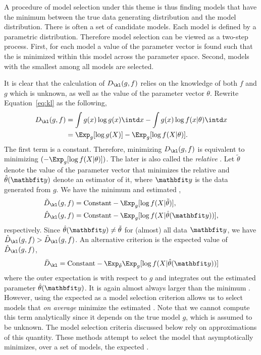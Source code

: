 A procedure of model selection under this theme is thus finding models that have the minimum \kld between the true data generating distribution and the model distribution. There is often a set of candidate models. Each model is defined by a parametric distribution. Therefore model selection can be viewed as a two-step process. First, for each model a value of the parameter vector is found such that the \kld is minimized within this model across the parameter space. Second, models with the smallest \kld among all models are selected.

It is clear that the calculation of $D_{\kl}(g,f)$ relies on the knowledge of both $f$ and $g$ which is unknown, as well as the value of the parameter vector $\theta$. Rewrite Equation~\eqref{eq:kl} as the following,
\begin{align}
  D_{\kl}(g,f)
  &= \int g(x)\log g(x) \intd x - \int g(x) \log f(x|\theta) \intd x \notag\\
  &= \Exp_g[\log g(X)] - \Exp_g[\log f(X|\theta)].
\end{align}
The first term is a constant. Therefore, minimizing $D_{\kl}(g,f)$ is equivalent to minimizing $(-\Exp_g[\log f(X|\theta)])$. The later is also called the \emph{relative} \kldfull. Let $\tilde\theta$ denote the value of the parameter vector that minimizes the relative \kld and $\hat\theta(\data)$ denote an estimator of it, where $\data$ is the data generated from $g$. We have the minimum and estimated \kld,
\begin{align}
  \tilde{D}_{\kl}(g,f) &= \text{Constant} - \Exp_g[\log f(X|\tilde\theta)], \\
  \hat{D}_{\kl}(g,f) &= \text{Constant} - \Exp_g[\log f(X|\hat\theta(\data))],
\end{align}
respectively. Since $\hat\theta(\data)\ne\tilde\theta$ for (almost) all data $\data$, we have $\hat{D}_{\kl}(g,f) > \tilde{D}_{\kl}(g,f)$. An alternative criterion is the expected value of $\hat{D}_{\kl}(g,f)$,
\begin{equation}
  \bar{D}_{\kl} = \text{Constant} -
  \Exp_{\hat\theta}\Exp_g[\log f(X|\hat\theta(\data))]
  \label{eq:expected kl}
\end{equation}
where the outer expectation is with respect to $g$ and integrates out the estimated parameter $\hat\theta(\data)$. It is again almost always larger than the minimum \kld. However, using the expected \kld as a model selection criterion allows us to select models that \emph{on average} minimize the estimated \kld. Note that we cannot compute this term analytically since it depends on the true model $g$, which is assumed to be unknown. The model selection criteria discussed below rely on approximations of this quantity. These methods attempt to select the model that asymptotically minimizes, over a set of models, the expected \kld.

